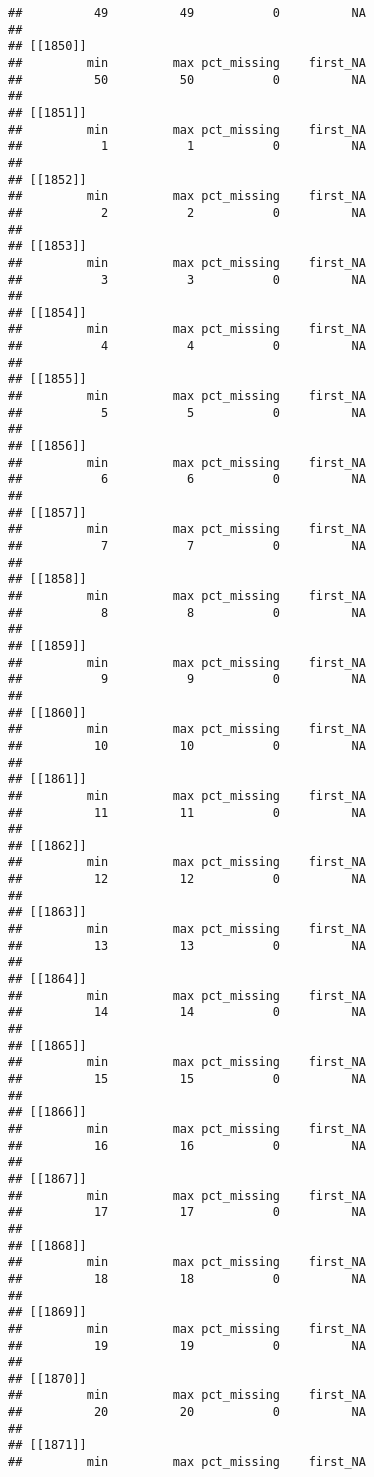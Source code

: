 \documentclass[
]{article}
\begin{document}
\begin{verbatim}
##          49          49           0          NA 
## 
## [[1850]]
##         min         max pct_missing    first_NA 
##          50          50           0          NA 
## 
## [[1851]]
##         min         max pct_missing    first_NA 
##           1           1           0          NA 
## 
## [[1852]]
##         min         max pct_missing    first_NA 
##           2           2           0          NA 
## 
## [[1853]]
##         min         max pct_missing    first_NA 
##           3           3           0          NA 
## 
## [[1854]]
##         min         max pct_missing    first_NA 
##           4           4           0          NA 
## 
## [[1855]]
##         min         max pct_missing    first_NA 
##           5           5           0          NA 
## 
## [[1856]]
##         min         max pct_missing    first_NA 
##           6           6           0          NA 
## 
## [[1857]]
##         min         max pct_missing    first_NA 
##           7           7           0          NA 
## 
## [[1858]]
##         min         max pct_missing    first_NA 
##           8           8           0          NA 
## 
## [[1859]]
##         min         max pct_missing    first_NA 
##           9           9           0          NA 
## 
## [[1860]]
##         min         max pct_missing    first_NA 
##          10          10           0          NA 
## 
## [[1861]]
##         min         max pct_missing    first_NA 
##          11          11           0          NA 
## 
## [[1862]]
##         min         max pct_missing    first_NA 
##          12          12           0          NA 
## 
## [[1863]]
##         min         max pct_missing    first_NA 
##          13          13           0          NA 
## 
## [[1864]]
##         min         max pct_missing    first_NA 
##          14          14           0          NA 
## 
## [[1865]]
##         min         max pct_missing    first_NA 
##          15          15           0          NA 
## 
## [[1866]]
##         min         max pct_missing    first_NA 
##          16          16           0          NA 
## 
## [[1867]]
##         min         max pct_missing    first_NA 
##          17          17           0          NA 
## 
## [[1868]]
##         min         max pct_missing    first_NA 
##          18          18           0          NA 
## 
## [[1869]]
##         min         max pct_missing    first_NA 
##          19          19           0          NA 
## 
## [[1870]]
##         min         max pct_missing    first_NA 
##          20          20           0          NA 
## 
## [[1871]]
##         min         max pct_missing    first_NA 

\end{verbatim}
\end{document}
